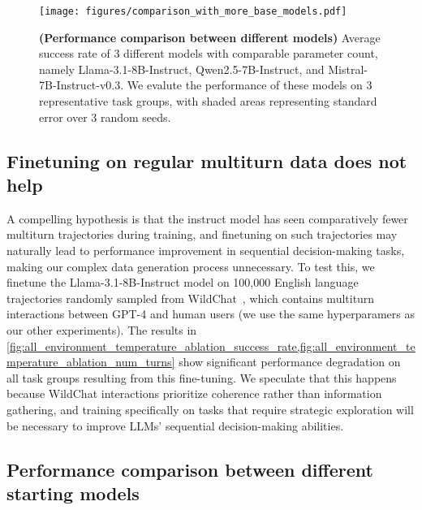 \begin{figure*}
    \centering
    \texttt{[image: figures/comparison\_with\_more\_base\_models.pdf]}
    \vspace{-0.3cm}
    \caption{\footnotesize \textbf{(Performance comparison between different models)} Average success rate of 3 different models with comparable parameter count, namely Llama-3.1-8B-Instruct, Qwen2.5-7B-Instruct, and Mistral-7B-Instruct-v0.3. We evalute the performance of these models on 3 representative task groups, with shaded areas representing standard error over 3 random seeds.}
    \label{fig:comparison_between_more_base_models}
    \vspace{-0.2cm}
\end{figure*}

\subsection{Finetuning on regular multiturn data does not help}

A compelling hypothesis is that the instruct model has seen comparatively fewer multiturn trajectories during training, and finetuning on such trajectories may naturally lead to performance improvement in sequential decision-making tasks, making our complex data generation process unnecessary. To test this, we finetune the Llama-3.1-8B-Instruct model on 100,000 English language trajectories randomly sampled from WildChat~\citep{zhao2024wildchat1mchatgptinteraction}, which contains multiturn interactions between GPT-4 and human users (we use the same hyperparamers as our other experiments). The results in \cref{fig:all_environment_temperature_ablation_success_rate,fig:all_environment_temperature_ablation_num_turns} show significant performance degradation on all task groups resulting from this fine-tuning. We speculate that this happens because WildChat interactions prioritize coherence rather than information gathering, and training specifically on tasks that require strategic exploration will be necessary to improve LLMs' sequential decision-making abilities.

\subsection{Performance comparison between different starting models}

